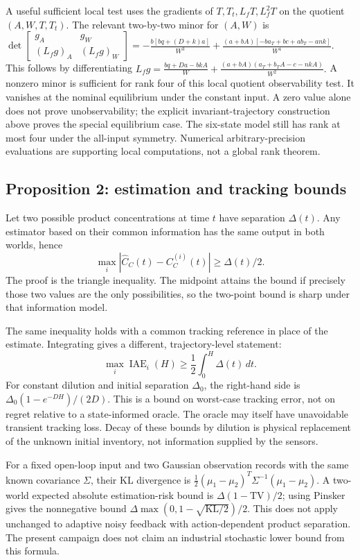 \documentclass[
  11pt,
]{article}
\begin{document}
A useful sufficient local test uses the gradients of
\(T,T_t,L_fT,L_f^2T\) on the quotient \((A,W,T,T_t)\). The relevant
two-by-two minor for \((A,W)\) is
\(\det\begin{bmatrix}g_A&g_W\\(L_fg)_A&(L_fg)_W\end{bmatrix} =-\frac{b[bq+(D+k)a]}{W^3} +\frac{(a+bA)[-ba_T+bc+ab_T-ank]}{W^4}.\)
This follows by differentiating
\(L_fg=\frac{bq+Da-bkA}{W} +\frac{(a+bA)(a_T+b_TA-c-nkA)}{W^2}.\) A
nonzero minor is sufficient for rank four of this local quotient
observability test. It vanishes at the nominal equilibrium under the
constant input. A zero value alone does not prove unobservability; the
explicit invariant-trajectory construction above proves the special
equilibrium case. The six-state model still has rank at most four under
the all-input symmetry. Numerical arbitrary-precision evaluations are
supporting local computations, not a global rank theorem.

\hypertarget{proposition-2-estimation-and-tracking-bounds}{%
\subsection{Proposition 2: estimation and tracking
bounds}\label{proposition-2-estimation-and-tracking-bounds}}

Let two possible product concentrations at time \(t\) have separation
\(\Delta(t)\). Any estimator based on their common information has the
same output in both worlds, hence
\[\max_i|\hat C_C(t)-C_C^{(i)}(t)|\geq\Delta(t)/2.\] The proof is the
triangle inequality. The midpoint attains the bound if precisely those
two values are the only possibilities, so the two-point bound is sharp
under that information model.

The same inequality holds with a common tracking reference in place of
the estimate. Integrating gives a different, trajectory-level statement:
\[\max_i\operatorname{IAE}_i(H)\geq\frac12\int_0^H\Delta(t)\,dt.\] For
constant dilution and initial separation \(\Delta_0\), the right-hand
side is \(\Delta_0(1-e^{-DH})/(2D)\). This is a bound on worst-case
tracking error, not on regret relative to a state-informed oracle. The
oracle may itself have unavoidable transient tracking loss. Decay of
these bounds by dilution is physical replacement of the unknown initial
inventory, not information supplied by the sensors.

For a fixed open-loop input and two Gaussian observation records with
the same known covariance \(\Sigma\), their KL divergence is
\(\frac12(\mu_1-\mu_2)^T\Sigma^{-1}(\mu_1-\mu_2)\). A two-world expected
absolute estimation-risk bound is \(\Delta(1-\mathrm{TV})/2\); using
Pinsker gives the nonnegative bound
\(\Delta\max(0,1-\sqrt{\mathrm{KL}/2})/2\). This does not apply
unchanged to adaptive noisy feedback with action-dependent product
separation. The present campaign does not claim an industrial stochastic
lower bound from this formula.
\end{document}
